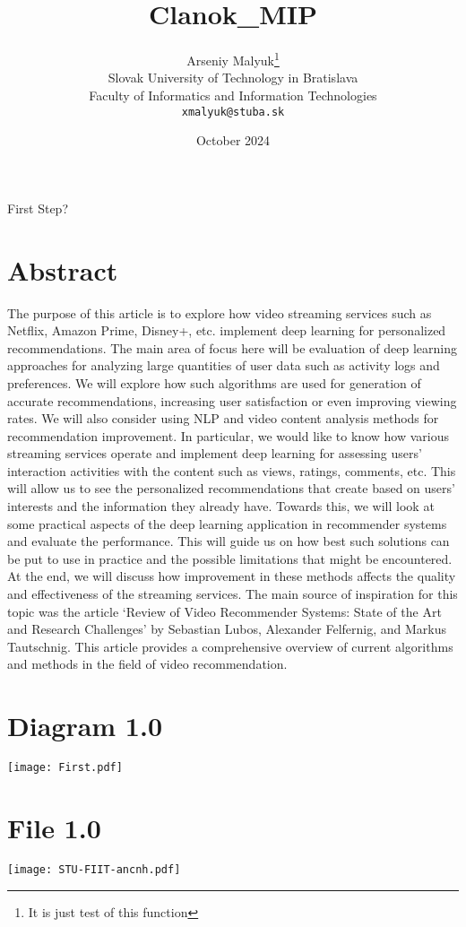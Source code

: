 \documentclass[10pt,twocolumn,twoside,a4paper]{article}
\title{Clanok_MIP}
\author{Arseniy Malyuk\thanks{It is just test of this function}\\[2pt]
	{\small Slovak University of Technology in Bratislava}\\
	{\small Faculty of Informatics and Information Technologies}\\
	{\small \texttt{xmalyuk@stuba.sk}}
	}
\date{October 2024}
\begin{document}
\maketitle
First Step?

\section{Abstract}
The purpose of this article is to explore how video streaming services such as Netflix, Amazon Prime, Disney+, etc. implement deep learning for personalized recommendations. The main area of focus here will be evaluation of deep learning approaches for analyzing large quantities of user data such as activity logs and preferences. We will explore how such algorithms are used for generation of accurate recommendations, increasing user satisfaction or even improving viewing rates. We will also consider using NLP and video content analysis methods for recommendation improvement. In particular, we would like to know how various streaming services operate and implement deep learning for assessing users’ interaction activities with the content such as views, ratings, comments, etc. This will allow us to see the personalized recommendations that create based on users’ interests and the information they already have. Towards this, we will look at some practical aspects of the deep learning application in recommender systems and evaluate the performance. This will guide us on how best such solutions can be put to use in practice and the possible limitations that might be encountered. At the end, we will discuss how improvement in these methods affects the quality and effectiveness of the streaming services. The main source of inspiration for this topic was the article ‘Review of Video Recommender Systems: State of the Art and Research Challenges’ by Sebastian Lubos, Alexander Felfernig, and Markus Tautschnig. This article provides a comprehensive overview of current algorithms and methods in the field of video recommendation.

\section{Diagram 1.0}
\texttt{[image: First.pdf]}

\section{File 1.0}
\texttt{[image: STU-FIIT-ancnh.pdf]}
\end{document}
